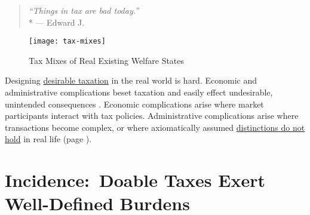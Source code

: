 


\begin{quote}
	\emph{``Things in tax are bad today.''}
	\\*
	--- Edward J.\ \citet[893]{McCaffery2005}
\end{quote}


 \begin{figure}[htbp]
	\centering
	\texttt{[image: tax-mixes]}
	\caption[Tax Mixes]{Tax Mixes of Real Existing Welfare States}
	\label{fig:tax-mixes}
\end{figure}


Designing \hyperref[sec:axiology]{desirable taxation} in the real world is hard.
Economic and administrative complications beset taxation and easily effect undesirable, unintended consequences \citep{Merton-1968-aa}.
Economic complications arise where market participants interact with tax policies.
Administrative complications arise where transactions become complex, or where axiomatically assumed \hyperref[sec:work-play]{distinctions do not hold} in real life (page \pageref{sec:work-play}).

\section[Incidence]{Incidence:~Doable Taxes Exert Well-Defined Burdens} \label{sec:tax-incidence}




